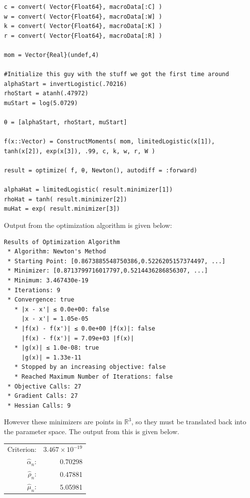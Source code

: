 \documentclass[12pt]{paper}
\newcommand{\setR}{ \mathbb{R} }
\newcommand{\est}[2][n]{ \widehat{ #2 }_{#1}}
\begin{document}
\begin{verbatim}
c = convert( Vector{Float64}, macroData[:C] )
w = convert( Vector{Float64}, macroData[:W] )
k = convert( Vector{Float64}, macroData[:K] )
r = convert( Vector{Float64}, macroData[:R] )

mom = Vector{Real}(undef,4)

#Initialize this guy with the stuff we got the first time around
alphaStart = invertLogistic(.70216)
rhoStart = atanh(.47972)
muStart = log(5.0729)

θ = [alphaStart, rhoStart, muStart]

f(x::Vector) = ConstructMoments( mom, limitedLogistic(x[1]), tanh(x[2]), exp(x[3]), .99, c, k, w, r, W )

result = optimize( f, θ, Newton(), autodiff = :forward)

alphaHat = limitedLogistic( result.minimizer[1])
rhoHat = tanh( result.minimizer[2])
muHat = exp( result.minimizer[3])
\end{verbatim}

Output from the optimization algorithm is given below:

\begin{verbatim}
Results of Optimization Algorithm
 * Algorithm: Newton's Method
 * Starting Point: [0.8673885548750386,0.5226205157374497, ...]
 * Minimizer: [0.8713799716017797,0.5214436286856307, ...]
 * Minimum: 3.467430e-19
 * Iterations: 9
 * Convergence: true
   * |x - x'| ≤ 0.0e+00: false 
     |x - x'| = 1.05e-05 
   * |f(x) - f(x')| ≤ 0.0e+00 |f(x)|: false
     |f(x) - f(x')| = 7.09e+03 |f(x)|
   * |g(x)| ≤ 1.0e-08: true 
     |g(x)| = 1.33e-11 
   * Stopped by an increasing objective: false
   * Reached Maximum Number of Iterations: false
 * Objective Calls: 27
 * Gradient Calls: 27
 * Hessian Calls: 9
\end{verbatim}

However these minimizers are points in $\setR^3$, so they must be
translated back into the parameter space. The output from this is
given below.

\begin{center}
  \begin{tabular}{rr}
    Criterion: & $3.467 \times 10^{-19}$\\
\(\est{\alpha}\): & 0.70298\\
\(\est{\rho}\): & 0.47881\\
\(\est{\mu}\): & 5.05981\\
\end{tabular}
\end{center}
\end{document}
